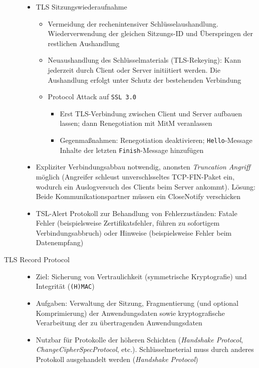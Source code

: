 \begin{description}
\begin{itemize}
\begin{itemize}
\begin{itemize}
			\end{itemize}
		\end{itemize}
		\item TLS Sitzungswiederaufnahme
		\begin{itemize}
			\item Vermeidung der rechenintensiver Schlüsselaushandlung. Wiederverwendung der gleichen Sitzungs-ID und Überspringen der restlichen Aushandlung
			\item Neuaushandlung des Schlüsselmaterials (TLS-Rekeying): Kann jederzeit durch Client oder Server initiitiert werden. Die Aushandlung erfolgt unter Schutz der bestehenden Verbindung
			\item Protocol Attack auf \texttt{SSL 3.0}
			\begin{itemize}
				\item Erst TLS-Verbindung zwischen Client und Server aufbauen lassen; dann Renegotiation mit MitM veranlassen
				\item Gegenmaßnahmen: Renegotiation deaktivieren; \texttt{Hello}-Message Inhalte der letzten \texttt{Finish}-Message hinzufügen
			\end{itemize}
		\end{itemize}
		\item Expliziter Verbindungsabbau notwendig, anonsten \textit{Truncation Angriff} möglich (Angreifer schleust unverschlsseltes TCP-FIN-Paket ein, wodurch ein Auslogversuch des Clients beim Server ankommt). Lösung: Beide Kommunikationspartner müssen ein CloseNotify verschicken
		\item TSL-Alert Protokoll zur Behandlung von Fehlerzuständen: Fatale Fehler (beispielsweise Zertifikatsfehler, führen zu sofortigem Verbindungsabbruch) oder Hinweise (beispielsweise Fehler beim Datenempfang)
	\end{itemize}
	\item[TLS Record Protocol]\hfill
	\begin{itemize}
		\item Ziel: Sicherung von Vertraulichkeit (symmetrische Kryptografie) und Integrität (\texttt{(H)MAC})
		\item Aufgaben: Verwaltung der Sitzung, Fragmentierung (und optional Komprimierung) der Anwendungsdaten sowie kryptografische Verarbeitung der zu übertragenden Anwendungsdaten
		\item Nutzbar für Protokolle der höheren Schichten (\textit{Handshake Protocol}, \textit{ChangeCipherSpecProtocol}, etc.). Schlüsselmeterial muss durch anderes Protokoll ausgehandelt werden (\textit{Handshake Protocol})

\end{itemize}
\end{description}
